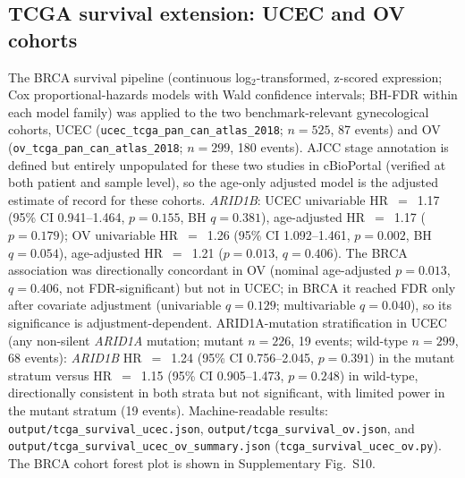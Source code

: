 \documentclass[11pt,a4paper]{article}
\begin{document}
\subsection{TCGA survival extension: UCEC and OV cohorts}
\label{sec:survival_ucec_ov}
\begin{sloppypar}
The BRCA survival pipeline (continuous log$_2$-transformed, z-scored expression; Cox proportional-hazards models with Wald confidence intervals; BH-FDR within each model family) was applied to the two benchmark-relevant gynecological cohorts, UCEC (\texttt{ucec\_tcga\_pan\_can\_atlas\_2018}; $n=525$, 87 events) and OV (\texttt{ov\_tcga\_pan\_can\_atlas\_2018}; $n=299$, 180 events). AJCC stage annotation is defined but entirely unpopulated for these two studies in cBioPortal (verified at both patient and sample level), so the age-only adjusted model is the adjusted estimate of record for these cohorts. \textit{ARID1B}: UCEC univariable HR~$=$~1.17 (95\% CI 0.941--1.464, $p=0.155$, BH $q=0.381$), age-adjusted HR~$=$~1.17 ($p=0.179$); OV univariable HR~$=$~1.26 (95\% CI 1.092--1.461, $p=0.002$, BH $q=0.054$), age-adjusted HR~$=$~1.21 ($p=0.013$, $q=0.406$). The BRCA association was directionally concordant in OV (nominal age-adjusted $p=0.013$, $q=0.406$, not FDR-significant) but not in UCEC; in BRCA it reached FDR only after covariate adjustment (univariable $q=0.129$; multivariable $q=0.040$), so its significance is adjustment-dependent. ARID1A-mutation stratification in UCEC (any non-silent \textit{ARID1A} mutation; mutant $n=226$, 19 events; wild-type $n=299$, 68 events): \textit{ARID1B} HR~$=$~1.24 (95\% CI 0.756--2.045, $p=0.391$) in the mutant stratum versus HR~$=$~1.15 (95\% CI 0.905--1.473, $p=0.248$) in wild-type, directionally consistent in both strata but not significant, with limited power in the mutant stratum (19 events). Machine-readable results: \texttt{output/tcga\_survival\_ucec.json}, \texttt{output/tcga\_survival\_ov.json}, and \texttt{output/tcga\_survival\_ucec\_ov\_summary.json} (\texttt{tcga\_survival\_ucec\_ov.py}). The BRCA cohort forest plot is shown in Supplementary Fig.~S10.
\end{sloppypar}
\end{document}
